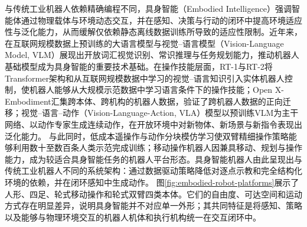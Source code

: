 与传统工业机器人依赖精确编程不同，具身智能（Embodied Intelligence）强调智能体通过物理载体与环境动态交互，并在感知、决策与行动的闭环中提高环境适应性与泛化能力，从而缓解仅依赖静态离线数据训练所导致的适应性限制\cite{zheng2026embodiedtrend}。近年来，在互联网规模数据上预训练的大语言模型与视觉--语言模型（Vision-Language Model, VLM）展现出开放词汇视觉识别、常识推理与任务规划能力，推动机器人基础模型成为具身智能的重要技术基础\cite{firoozi2025foundation}。在操作技能层面，RT-1与RT-2将Transformer架构和从互联网规模数据中学习的视觉--语言知识引入实体机器人控制，使机器人能够从大规模示范数据中学习语言条件下的操作技能\cite{brohan2022rt1,brohan2023rt2}；Open X-Embodiment汇集跨本体、跨机构的机器人数据，验证了跨机器人数据的正向迁移\cite{openx2024rtx}；视觉--语言--动作（Vision-Language-Action, VLA）模型以预训练VLM为主干网络、以动作专家生成连续动作，在开放环境中对新物体、新场景与新指令表现出泛化能力\cite{kim2024openvla,black2024pi0,black2025pi05}。
%
与此同时，低成本遥操作与动作分块模仿学习使双臂精细操作策略能够利用数十至数百条人类示范完成训练\cite{zhao2023act,fu2024mobilealoha}；移动操作机器人因兼具移动、规划与操作能力，成为较适合具身智能任务的机器人平台形态\cite{lan2024mobilemanipulator}。具身智能机器人由此呈现出与传统工业机器人不同的系统架构：通过数据驱动策略降低对逐点示教和完全结构化环境的依赖，并在闭环感知中生成动作。
图\ref{fig:embodied-robot-platforms}展示了人形、四足、轮式移动操作和轮式双臂四类本体。它们的自由度、可达空间和运动方式存在明显差异，说明具身智能并不对应单一外形；其共同特征是将感知、策略以及能够与物理环境交互的机器人机体和执行机构统一在交互闭环中。

